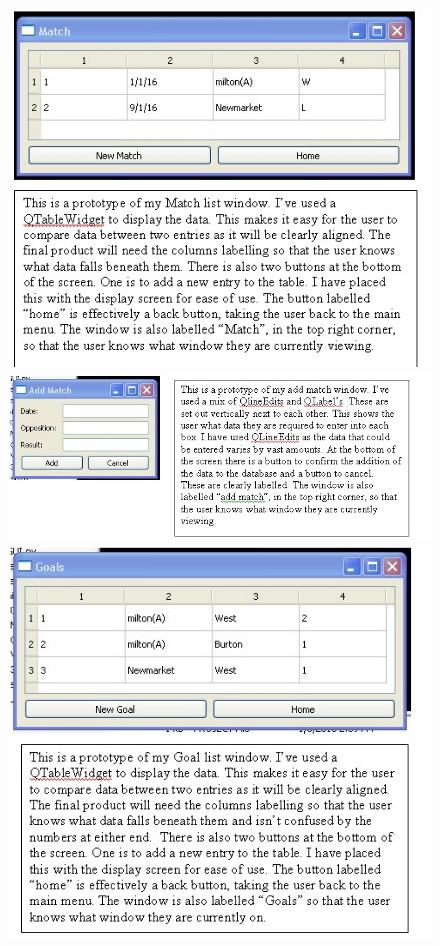 \begin{figure}[H]
	\includegraphics[width=150mm]{MatchPT}
	\includegraphics[width=150mm]{AddMatchPT}
	\includegraphics[width=150mm]{GoalsPT}

\end{figure}
